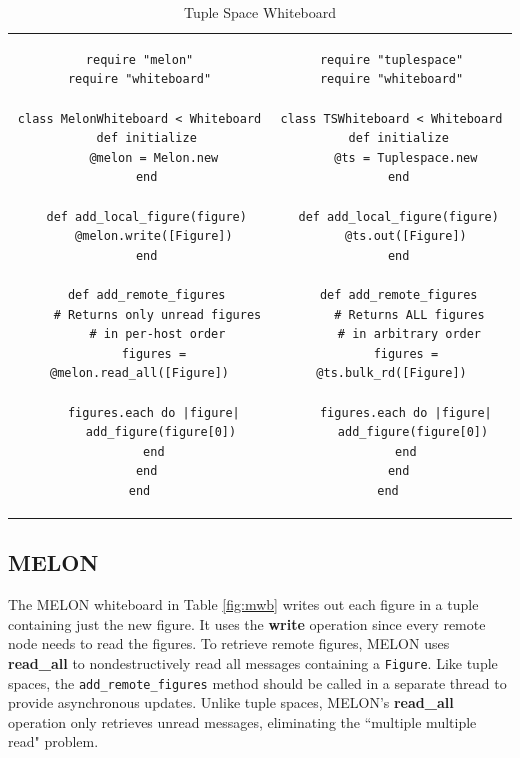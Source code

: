\documentclass{llncs}
\begin{document}
\begin{table}
\centering
\begin{tabular}{c c}
\begin{minipage}{2.75in}
\caption{MELON Whiteboard}\label{fig:mwb}
\begin{verbatim}
require "melon"
require "whiteboard"

class MelonWhiteboard < Whiteboard
  def initialize
    @melon = Melon.new
  end
  
  def add_local_figure(figure)
    @melon.write([Figure])
  end

  def add_remote_figures
  	 # Returns only unread figures
  	 # in per-host order
    figures = @melon.read_all([Figure])

    figures.each do |figure|
      add_figure(figure[0])
    end
  end
end
\end{verbatim}
\end{minipage}
&
\begin{minipage}{2.5in}
\caption{Tuple Space Whiteboard}\label{fig:tswb}
\begin{verbatim}
require "tuplespace"
require "whiteboard"

class TSWhiteboard < Whiteboard
  def initialize
    @ts = Tuplespace.new
  end

  def add_local_figure(figure)
    @ts.out([Figure])
  end

  def add_remote_figures
  	 # Returns ALL figures
  	 # in arbitrary order
    figures = @ts.bulk_rd([Figure])

    figures.each do |figure|
      add_figure(figure[0])
    end
  end
end	
\end{verbatim}
\end{minipage}
\end{tabular}
\end{table}

\subsection{MELON}

The MELON whiteboard in Table \ref{fig:mwb} writes out each figure in a tuple containing just the new figure. It uses the \textbf{write} operation since every remote node needs to read the figures. To retrieve remote figures, MELON uses \textbf{read\_all} to nondestructively read all messages containing a \texttt{Figure}. Like tuple spaces, the \texttt{add\_remote\_figures} method should be called in a separate thread to provide asynchronous updates. Unlike tuple spaces, MELON's \textbf{read\_all} operation only retrieves unread messages, eliminating the ``multiple multiple read" problem.
\end{document}
